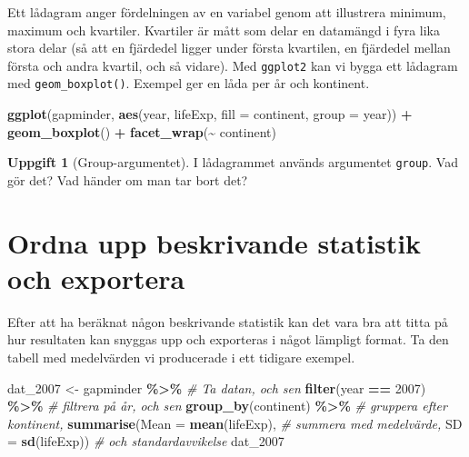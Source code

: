 \documentclass[
]{book}
\newenvironment{Shaded}{\begin{snugshade}}{\end{snugshade}}
\newcommand{\AttributeTok}[1]{\textcolor[rgb]{0.13,0.29,0.53}{#1}}
\newcommand{\CommentTok}[1]{\textcolor[rgb]{0.56,0.35,0.01}{\textit{#1}}}
\newcommand{\DecValTok}[1]{\textcolor[rgb]{0.00,0.00,0.81}{#1}}
\newcommand{\FunctionTok}[1]{\textcolor[rgb]{0.13,0.29,0.53}{\textbf{#1}}}
\newcommand{\NormalTok}[1]{#1}
\newcommand{\OtherTok}[1]{\textcolor[rgb]{0.56,0.35,0.01}{#1}}
\newcommand{\SpecialCharTok}[1]{\textcolor[rgb]{0.81,0.36,0.00}{\textbf{#1}}}
\theoremstyle{definition}
\theoremstyle{definition}
\theoremstyle{definition}
\newtheorem{exercise}{Uppgift}[chapter]
\theoremstyle{definition}
\theoremstyle{remark}
\begin{document}
Ett lådagram anger fördelningen av en variabel genom att illustrera minimum, maximum och kvartiler. Kvartiler är mått som delar en datamängd i fyra lika stora delar (så att en fjärdedel ligger under första kvartilen, en fjärdedel mellan första och andra kvartil, och så vidare). Med \texttt{ggplot2} kan vi bygga ett lådagram med \texttt{geom\_boxplot()}. Exempel ger en låda per år och kontinent.

\begin{Shaded}
\begin{Highlighting}[]
\FunctionTok{ggplot}\NormalTok{(gapminder, }\FunctionTok{aes}\NormalTok{(year, lifeExp, }\AttributeTok{fill =}\NormalTok{ continent, }
                      \AttributeTok{group =}\NormalTok{ year)) }\SpecialCharTok{+}
  \FunctionTok{geom\_boxplot}\NormalTok{() }\SpecialCharTok{+}                                                     
  \FunctionTok{facet\_wrap}\NormalTok{(}\SpecialCharTok{\textasciitilde{}}\NormalTok{ continent)                                              }
\end{Highlighting}
\end{Shaded}

\begin{exercise}[Group-argumentet]
I lådagrammet används argumentet \texttt{group}. Vad gör det? Vad händer om man tar bort det?
\end{exercise}

\section{Ordna upp beskrivande statistik och exportera}\label{ordna-upp-beskrivande-statistik-och-exportera}

Efter att ha beräknat någon beskrivande statistik kan det vara bra att titta på hur resultaten kan snyggas upp och exporteras i något lämpligt format. Ta den tabell med medelvärden vi producerade i ett tidigare exempel.

\begin{Shaded}
\begin{Highlighting}[]
\NormalTok{dat\_2007 }\OtherTok{\textless{}{-}}\NormalTok{ gapminder }\SpecialCharTok{\%\textgreater{}\%}         \CommentTok{\# Ta datan, och sen}
  \FunctionTok{filter}\NormalTok{(year }\SpecialCharTok{==} \DecValTok{2007}\NormalTok{) }\SpecialCharTok{\%\textgreater{}\%}        \CommentTok{\# filtrera på år, och sen}
  \FunctionTok{group\_by}\NormalTok{(continent) }\SpecialCharTok{\%\textgreater{}\%}         \CommentTok{\# gruppera efter kontinent,}
  \FunctionTok{summarise}\NormalTok{(}\AttributeTok{Mean =} \FunctionTok{mean}\NormalTok{(lifeExp), }\CommentTok{\# summera med medelvärde,}
            \AttributeTok{SD =} \FunctionTok{sd}\NormalTok{(lifeExp))     }\CommentTok{\# och standardavvikelse}
\NormalTok{dat\_2007}
\end{Highlighting}
\end{Shaded}
\end{document}
